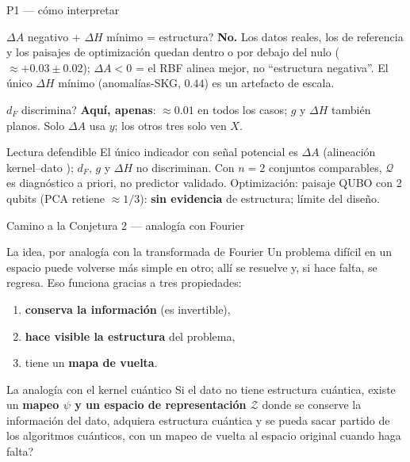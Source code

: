 \documentclass[aspectratio=169,10pt,professionalfonts]{beamer}
\begin{document}
\begin{frame}{P1 --- cómo interpretar}
\begin{block}{\textquestiondown{}$\Delta A$ negativo + $\Delta H$ mínimo = estructura?}
{\footnotesize
\textbf{No.} Los datos reales, los de referencia y los
paisajes de optimizaci\'on quedan dentro o por debajo del nulo ($\approx+0.03\pm0.02$);
$\Delta A<0$ = el RBF alinea mejor, no ``estructura negativa''.
El \'unico $\Delta H$ m\'inimo (anomal\'ias-SKG, $0.44$) es un artefacto de escala.}
\end{block}
\vspace{0.35em}
\begin{block}{\textquestiondown{}$d_F$ discrimina?}
{\footnotesize
\textbf{Aqu\'i, apenas}: $\approx 0.01$ en todos los casos; $g$ y $\Delta H$ tambi\'en planos.
Solo $\Delta A$ usa $y$; los otros tres solo ven $X$.}
\end{block}
\vspace{0.35em}
\begin{alertblock}{Lectura defendible}
{\footnotesize
El \'unico indicador con se\~nal potencial es $\Delta A$ (alineaci\'on kernel--dato \citep{liu2021,huang2021});
$d_F$, $g$ y $\Delta H$ no discriminan. Con $n=2$ conjuntos comparables, $\mathcal{Q}$ es diagn\'ostico a priori, no predictor validado. Optimizaci\'on: paisaje QUBO con 2 qubits
(PCA retiene $\approx 1/3$): \textbf{sin evidencia} de estructura; l\'imite del dise\~no.}
\end{alertblock}
\end{frame}

\begin{frame}{Camino a la Conjetura 2 --- analogía con Fourier}
\begin{block}{La idea, por analogía con la transformada de Fourier}
Un problema difícil en un espacio puede volverse más simple en otro;
allí se resuelve y, si hace falta, se regresa. Eso funciona gracias a tres propiedades:
\begin{enumerate}
  \item \textbf{conserva la información} (es invertible),
  \item \textbf{hace visible la estructura} del problema,
  \item tiene un \textbf{mapa de vuelta}.
\end{enumerate}
\end{block}
\vspace{0.2em}
\begin{alertblock}{La analogía con el kernel cuántico}
Si el dato no tiene estructura cuántica, \textquestiondown{}existe un \textbf{mapeo $\psi$ y un espacio de
representación $\mathcal{Z}$} donde se conserve la información del dato, adquiera estructura cuántica y se
pueda sacar partido de los algoritmos cuánticos, con un mapeo de vuelta al espacio original cuando haga falta?
\end{alertblock}
\end{frame}
\end{document}
